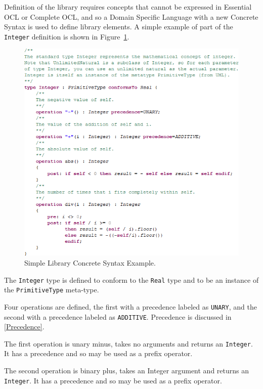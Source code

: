 \documentclass{eceasst}
\begin{document}
Definition of the library requires concepts that cannot be expressed in Essential OCL or Complete OCL, and so a Domain Specific Language with a new Concrete Syntax is used to define library elements. A simple example of part of the \verb|Integer| definition is shown in Figure~\ref{fig:SimpleExample}.

\begin{figure}
  \begin{center}
    \includegraphics[width=5.75in]{SimpleExample.png}
  \end{center}
  \caption{Simple Library Concrete Syntax Example.}
  \label{fig:SimpleExample}
\end{figure}

The \verb|Integer| type is defined to conform to the \verb|Real| type and to be an instance of the \verb|PrimitiveType| meta-type.

Four operations are defined, the first with a precedence labeled as \verb|UNARY|, and the second with a precedence labeled as \verb|ADDITIVE|. Precedence is discussed in \ref{Precedence}.

The first operation is unary minus, takes no arguments and returns an \verb|Integer|. It has a precedence and so may be used as a prefix operator.

The second operation is binary plus, takes an Integer argument and returns an \verb|Integer|. It has a precedence and so may be used as a prefix operator.
\end{document}
